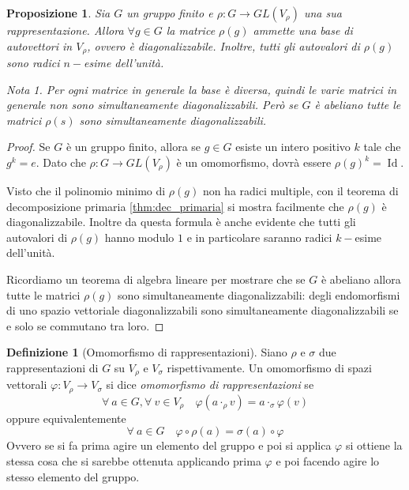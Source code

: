 \documentclass[11pt]{article}
\theoremstyle{plain}
\newtheorem{prop}[thm]{Proposizione}
\theoremstyle{definition}
\newtheorem{defn}{Definizione}[section]
\theoremstyle{remark}
\newtheorem*{note}{Nota}
\DeclareMathOperator{\Id}{Id}
\begin{document}
\begin{prop}
Sia $G$ un gruppo finito e $\rho: G \to GL(V_\rho)$ una sua rappresentazione. Allora $\forall g \in G$ la matrice $\rho(g)$ ammette una base di autovettori in $V_\rho$, ovvero è diagonalizzabile. Inoltre, tutti gli autovalori di $\rho(g)$ sono radici $n-$esime dell'unità.

\begin{note} Per ogni matrice in generale la base è diversa, quindi le varie matrici in generale \emph{non} sono simultaneamente diagonalizzabili.
Però se $G$ è abeliano tutte le matrici $\rho(s)$ sono simultaneamente diagonalizzabili.
\end{note}
\label{prop:diagonalizzabilita rappresentazioni}
\end{prop}

\begin{proof} Se $G$ è un gruppo finito, allora se $g\in G$ esiste un intero positivo $k$ tale che $g^k = e$.
Dato che $\rho:G\to GL(V_\rho)$ è un omomorfismo, dovrà essere $\rho(g)^k = \Id$.

Visto che il polinomio minimo di $\rho(g)$ non ha radici multiple, con il teorema di decomposizione primaria \eqref{thm:dec_primaria} si mostra facilmente che $\rho(g)$ è diagonalizzabile. Inoltre da questa formula è anche evidente che tutti gli autovalori di $\rho(g)$ hanno modulo $1$ e in particolare saranno radici $k-$esime dell'unità.

Ricordiamo un teorema di algebra lineare per mostrare che se $G$ è abeliano allora
tutte le matrici $\rho(g)$ sono simultaneamente diagonalizzabili:
degli endomorfismi di uno spazio vettoriale diagonalizzabili sono simultaneamente diagonalizzabili se e solo se commutano tra loro.
\end{proof}




\begin{defn}[Omomorfismo di rappresentazioni]
Siano $\rho$ e $\sigma$ due rappresentazioni di $G$ su $V_{\rho}$ e $V_{\sigma}$ rispettivamente. Un omomorfismo di spazi vettorali $\varphi:V_{\rho}\to V_{\sigma}$ si dice \textit{omomorfismo di rappresentazioni} se
\[ \forall\ a\in G, \forall\ v\in V_{\rho}\quad \varphi(a\cdot_\rho v) = a\cdot_\sigma \varphi(v) \]
oppure equivalentemente
\[ \forall\ a\in G\quad \varphi\circ \rho(a) = \sigma(a)\circ \varphi \]
Ovvero se si fa prima agire un elemento del gruppo e poi si applica $\varphi$ si ottiene la stessa cosa che si sarebbe ottenuta
applicando prima $\varphi$ e poi facendo agire lo stesso elemento del gruppo.
\end{defn}
\end{document}
